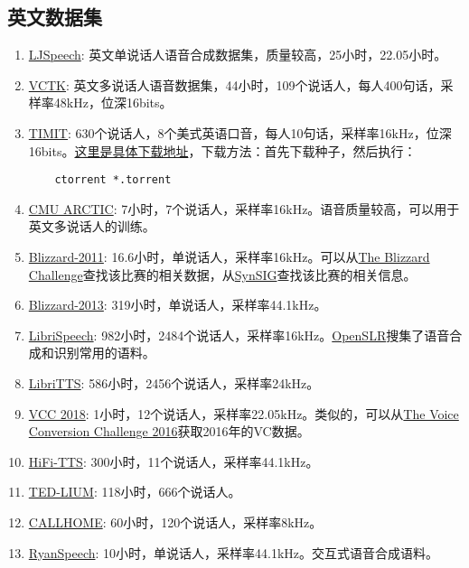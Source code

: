 \documentclass[cn,10pt,math=newtx,citestyle=gb7714-2015,bibstyle=gb7714-2015]{elegantbook}
\begin{document}
\subsection{英文数据集}
\begin{enumerate}
  \item \href{https://keithito.com/LJ-Speech-Dataset/}{LJSpeech}: 英文单说话人语音合成数据集，质量较高，25小时，22.05小时。
  \item \href{https://datashare.is.ed.ac.uk/handle/10283/2651}{VCTK}: 英文多说话人语音数据集，44小时，109个说话人，每人400句话，采样率48kHz，位深16bits。
  \item \href{https://catalog.ldc.upenn.edu/LDC93S1}{TIMIT}: 630个说话人，8个美式英语口音，每人10句话，采样率16kHz，位深16bits。\href{http://academictorrents.com/details/34e2b78745138186976cbc27939b1b34d18bd5b3}{这里是具体下载地址}，下载方法：首先下载种子，然后执行：
  \begin{lstlisting}
    ctorrent *.torrent
  \end{lstlisting}
  \item \href{http://festvox.org/cmu_arctic/packed/}{CMU ARCTIC}: 7小时，7个说话人，采样率16kHz。语音质量较高，可以用于英文多说话人的训练。
  \item \href{https://www.cstr.ed.ac.uk/projects/blizzard/2011/lessac_blizzard2011/}{Blizzard-2011}: 16.6小时，单说话人，采样率16kHz。可以从\href{https://www.cstr.ed.ac.uk/projects/blizzard/}{The Blizzard Challenge}查找该比赛的相关数据，从\href{https://www.synsig.org/index.php}{SynSIG}查找该比赛的相关信息。
  \item \href{https://www.cstr.ed.ac.uk/projects/blizzard/2013/lessac_blizzard2013/}{Blizzard-2013}: 319小时，单说话人，采样率44.1kHz。
  \item \href{https://www.openslr.org/12}{LibriSpeech}: 982小时，2484个说话人，采样率16kHz。\href{https://www.openslr.org/resources.php}{OpenSLR}搜集了语音合成和识别常用的语料。
  \item \href{https://www.openslr.org/60}{LibriTTS}: 586小时，2456个说话人，采样率24kHz。
  \item \href{https://datashare.ed.ac.uk/handle/10283/3061}{VCC 2018}: 1小时，12个说话人，采样率22.05kHz。类似的，可以从\href{https://datashare.ed.ac.uk/handle/10283/2211}{The Voice Conversion Challenge 2016}获取2016年的VC数据。
  \item \href{http://www.openslr.org/109/}{HiFi-TTS}: 300小时，11个说话人，采样率44.1kHz。
  \item \href{https://www.openslr.org/7/}{TED-LIUM}: 118小时，666个说话人。
  \item \href{https://catalog.ldc.upenn.edu/LDC97S42}{CALLHOME}: 60小时，120个说话人，采样率8kHz。
  \item \href{https://github.com/roholazandie/ryan-tts}{RyanSpeech}: 10小时，单说话人，采样率44.1kHz。交互式语音合成语料。

\end{enumerate}
\end{document}

